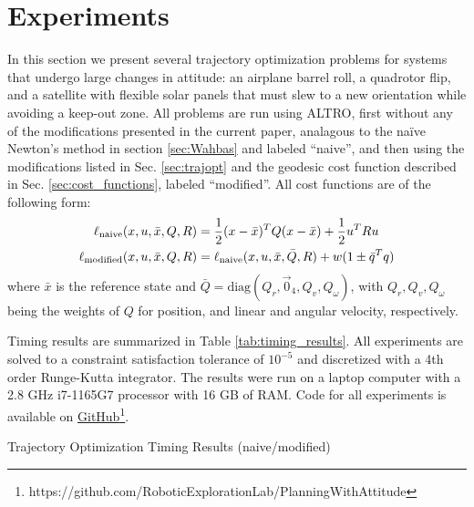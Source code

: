 \documentclass[../root.tex]{subfiles}
\begin{document}

\section{Experiments} \label{sec:experiments}
    In this section we present several trajectory optimization problems for systems that
    undergo large changes in attitude: an airplane barrel roll, a quadrotor flip, and a
    satellite with flexible solar panels that must slew to a new orientation while
    avoiding a keep-out zone.    
    All problems are run using ALTRO, first without any of the modifications presented in
    the current paper, analagous to the na\"ive Newton's method in section \ref{sec:Wahbas}
    and labeled ``naive'', and then using the modifications listed in Sec.
    \ref{sec:trajopt} and the geodesic cost function described in Sec.
    \ref{sec:cost_functions}, labeled ``modified''. All cost functions are of the
    following form:
    \begin{align}
        \ell_\text{naive}(x, u, \bar{x}, Q, R) &= \frac{1}{2} (x - \bar{x})^T Q (x - \bar{x}) + \frac{1}{2} u^T R u \\
        \ell_\text{modified}(x, u, \bar{x}, Q, R) 
            &= \ell_\text{naive}(x, u, \bar{x}, \bar{Q}, R) + w (1 \pm \bar{q}^T q)
    \end{align}
    where $\bar{x}$ is the reference state and $\bar{Q} = \text{diag}(Q_r, \vec{0}_4,
    Q_v, Q_\omega)$, with $Q_r,Q_v,Q_\omega$ being the weights of $Q$ for position, and
    linear and angular velocity, respectively.
    
    Timing results are summarized in Table \ref{tab:timing_results}. All experiments are 
    solved to a constraint satisfaction tolerance of $10^{-5}$ and discretized with a 4th 
    order Runge-Kutta integrator. The results were run on a laptop computer with a 2.8 GHz 
    i7-1165G7 processor with 16 GB of RAM. Code for all experiments is available on
    \href{https://github.com/RoboticExplorationLab/PlanningWithAttitude}
    {GitHub\footnote{\url{https://github.com/RoboticExplorationLab/PlanningWithAttitude}}}.

    \begin{table}
        \centering
        \caption{Trajectory Optimization Timing Results (naive/modified)}
        
        \label{tab:timing_results}
    \end{table}
        
\end{document}
